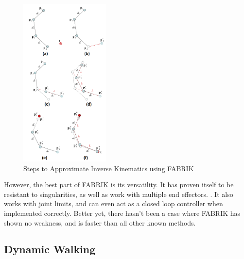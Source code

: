 \begin{figure}[thbp]
    \centering
    \includegraphics[width=0.4\textwidth]{Figures/FABRIK.png}
    \caption{Steps to Approximate Inverse Kinematics using FABRIK \cite{fabrik2011}}
    \label{fig:FABRIKSteps}
\end{figure}

However, the best part of FABRIK is its versatility. It has proven itself to be resistant to singularities, as well as work with multiple end effectors. \cite{fabrik2011}. It also works with joint limits, and can even act as a closed loop controller when implemented correctly. Better yet, there hasn't been a case where FABRIK has shown no weakness, and is faster than all other known methods.

\subsection{Dynamic Walking}